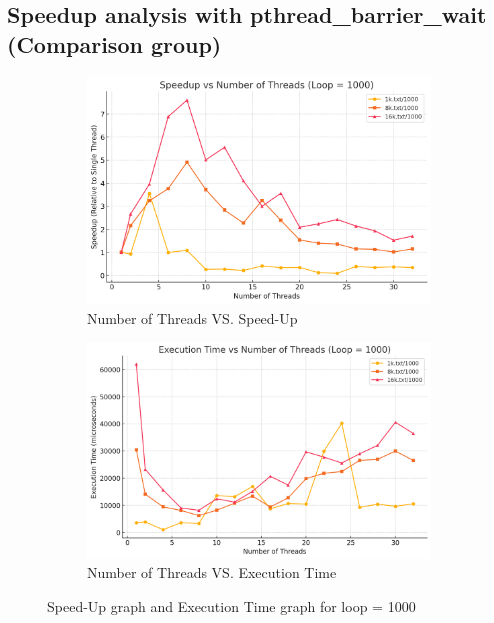 \documentclass[letterpaper,12pt]{article}
\theoremstyle{remark}
\begin{document}
\subsection{Speedup analysis with pthread\_barrier\_wait (Comparison group) }

\begin{figure}[H]
    \centering
    \begin{subfigure}[t]{0.48\textwidth}  %
        \centering
        \includegraphics[width=\textwidth]{pthread_wait_speedup.png}
        \caption{Number of Threads VS. Speed-Up}
        \label{fig:ThreadVsSpeedUp1}
    \end{subfigure}
    \hfill  %
    \begin{subfigure}[t]{0.48\textwidth}  %
        \centering
        \includegraphics[width=\textwidth]{pthread_wait_execution.png}
        \caption{Number of Threads VS. Execution Time}
        \label{fig:ThreadVsExecutionTime}
    \end{subfigure}
    \caption{Speed-Up graph and Execution Time graph for loop = 1000}
    \label{fig:ThreadVsComparison}
\end{figure}
\hfill  %
\end{document}
